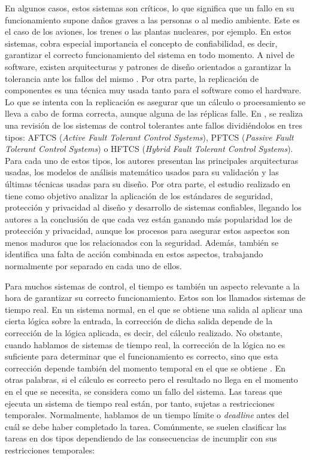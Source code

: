 En algunos casos, estos sistemas son críticos, lo que significa que un fallo en
su funcionamiento supone daños graves a las personas o al medio ambiente. Este
es el caso de los aviones, los trenes o las plantas nucleares, por ejemplo. En
estos sistemas, cobra especial importancia el concepto de confiabilidad, es
decir, garantizar el correcto funcionamiento del sistema en todo momento. A
nivel de software, existen arquitecturas y patrones de diseño orientados a
garantizar la tolerancia ante los fallos del mismo
\cite{pullum_software_2001}\cite{randell_system_1975}. Por otra parte, la
replicación de componentes \cite{hutchison_dependable_2006} es una técnica muy
usada tanto para el software como el hardware. Lo que se intenta con la
replicación es asegurar que un cálculo o procesamiento se lleva a cabo de forma
correcta, aunque alguna de las réplicas falle. En \cite{amin_review_2019}, se
realiza una revisión de los sistemas de control tolerantes ante fallos
dividiéndolos en tres tipos: AFTCS (\textit{Active Fault Tolerant Control
  Systems}), PFTCS (\textit{Passive Fault Tolerant Control Systems}) o HFTCS
(\textit{Hybrid Fault Tolerant Control Systems}). Para cada uno de estos tipos,
los autores presentan las principales arquitecturas usadas, los modelos de
análisis matemático usados para su validación y las últimas técnicas usadas para
su diseño. Por otra parte, el estudio realizado en \cite{shan_survey_2019}
tiene como objetivo analizar la aplicación de los estándares de seguridad,
protección y privacidad al diseño y desarrollo de sistemas confiables, llegando
los autores a la conclusión de que cada vez están ganando más popularidad los
de protección y privacidad, aunque los procesos para asegurar estos aspectos son
menos maduros que los relacionados con la seguridad. Además, también se
identifica una falta de acción combinada en estos aspectos, trabajando
normalmente por separado en cada uno de ellos.

Para muchos sistemas de control, el tiempo es también un aspecto relevante a la
hora de garantizar su correcto funcionamiento. Estos son los llamados sistemas
de tiempo real. En un sistema normal, en el que se obtiene una salida al aplicar
una cierta lógica sobre la entrada, la corrección de dicha salida depende de la
corrección de la lógica aplicada, es decir, del cálculo realizado. No obstante,
cuando hablamos de sistemas de tiempo real, la corrección de la lógica no es
suficiente para determinar que el funcionamiento es correcto, sino que esta
corrección depende también del momento temporal en el que se obtiene
\cite{gambier_real-time_2004}. En otras palabras, si el cálculo es correcto pero
el resultado no llega en el momento en el que se necesita, se considera como un
fallo del sistema. Las tareas que ejecuta un sistema de tiempo real están, por
tanto, sujetas a restricciones temporales. Normalmente, hablamos de un tiempo
límite o \textit{deadline} antes del cuál se debe haber completado la tarea.
Comúnmente, se suelen clasificar las tareas en dos tipos dependiendo de las
consecuencias de incumplir con sus restricciones temporales:

